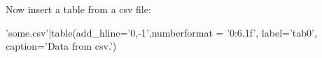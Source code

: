 
Now insert a table from a csv file:

{{ 'some.csv'|table(add_hline='0,-1',numberformat = '{0:6.1f}', label='tab0', caption='Data from csv.') }}

